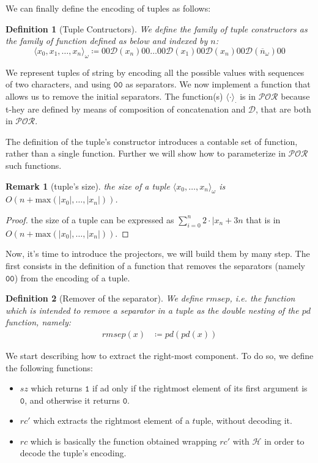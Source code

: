 \documentclass[10pt]{amsart}
\newcommand{\POR}{\mathcal{POR}}
\newcommand{\zero}{\mathtt{0}}
\newcommand{\one}{\mathtt{1}}
\newcommand{\vone}{x}
\newcommand{\oone}{\omega}
\newcommand{\pred}{pd}
\newcommand{\db}{\mathcal D}
\newcommand{\hv}{\mathcal H}
\newtheorem{defn}{Definition}
\newtheorem{remark}{Remark}
\begin{document}
We can finally define the encoding of tuples as follows:

\begin{defn}[Tuple Contructors]
We define the family of tuple constructors as the family of function defined as below and indexed by $n$:
\[
\langle \vone_0, \vone_1, \ldots, \vone_n\rangle_\oone \coloneqq 00 \db (\vone_n) 00 \ldots 00 \db (\vone_1) 00  \db(\vone_n) 00 \db(\overline n_\oone) 00
\]
\end{defn}

We represent tuples of string by encoding all the possible values with sequences of two characters, and using $\mathtt{00}$ as separators. We now implement a function that allows us to remove the initial separators. The function(s) $\langle \cdot \rangle _\cdot$ is in $\POR$ because t-hey are defined by means of composition of concatenation and $\db$, that are both in $\POR$.

The definition of the tuple's constructor introduces a contable set of function, rather than a single function. Further we will show how to parameterize in $\POR$ such functions.

\begin{remark}[tuple's size]
\label{remark:tsize}
the size of a tuple $\langle \vone_0, \ldots,\vone_n\rangle_\oone$ is $O(n+ \text{max}(|\vone_0|, \ldots, |\vone_n|))$.
\end{remark}
\begin{proof}
the size of a tuple can be expressed as $\sum_{i=0}^n 2 \cdot {|\vone_n}+ 3n$ that is in $O(n+ \text{max}(|\vone_0|, \ldots, |\vone_n|))$.
\end{proof}

Now, it's time to introduce the projectors, we will build them by many step. The first consists in the definition of a function that removes the separators (namely $\zero\zero$) from the encoding of a tuple.

\begin{defn}[Remover of the separator]
We define $rmsep$, i.e. the function which is intended to remove a separator in a tuple as the double nesting of the $pd$ function, namely:
\begin{align*}
rmsep(\vone) &\coloneqq \pred(\pred(\vone))
\end{align*}
\end{defn}

We start describing how to extract the right-most component. To do so, we define the following functions:
\begin{itemize}
\item $sz$ which returns $\one$ if ad only if the rightmost element of its first argument is $\zero$, and otherwise it returns $\zero$.
\item $rc'$ which extracts the rightmost element of a $t$uple, without decoding it.
\item $rc$ which is basically the function obtained wrapping $rc'$ with $\hv$ in order to decode the tuple's encoding.
\end{itemize}
\end{document}
